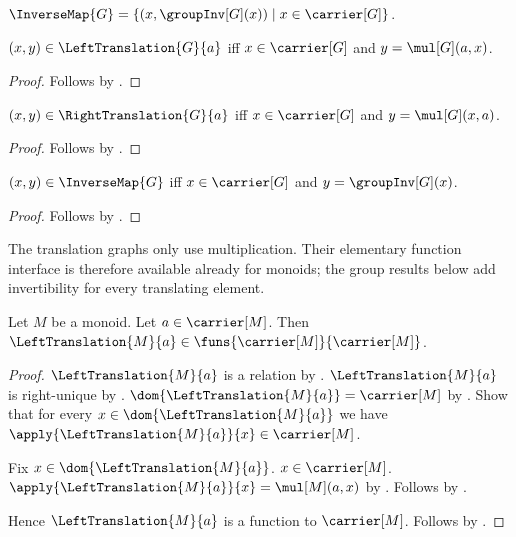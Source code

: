 \begin{definition}\label{inverse_map}
    $\InverseMap{G}=
        \{(x,\groupInv[G](x))\mid x\in\carrier[G]\}$.
\end{definition}

\begin{proposition}\label{left_translation_iff}
    $(x,y)\in\LeftTranslation{G}{a}$ iff
        $x\in\carrier[G]$ and $y=\mul[G](a,x)$.
\end{proposition}
\begin{proof}
    Follows by .
\end{proof}
\begin{proposition}\label{right_translation_iff}
    $(x,y)\in\RightTranslation{G}{a}$ iff
        $x\in\carrier[G]$ and $y=\mul[G](x,a)$.
\end{proposition}
\begin{proof}
    Follows by .
\end{proof}

\begin{proposition}\label{inverse_map_iff}
    $(x,y)\in\InverseMap{G}$ iff
        $x\in\carrier[G]$ and $y=\groupInv[G](x)$.
\end{proposition}
\begin{proof}
    Follows by .
\end{proof}

The translation graphs only use multiplication.  Their elementary function
interface is therefore available already for monoids; the group results below
add invertibility for every translating element.

\begin{proposition}\label{left_translation_monoid_function}
    Let $M$ be a monoid.
    Let $a\in\carrier[M]$.
    Then $\LeftTranslation{M}{a}\in
        \funs{\carrier[M]}{\carrier[M]}$.
\end{proposition}
\begin{proof}
    $\LeftTranslation{M}{a}$ is a relation
        by .
    $\LeftTranslation{M}{a}$ is right-unique
        by .
    $\dom{\LeftTranslation{M}{a}}=\carrier[M]$
        by .
    Show that for every $x\in\dom{\LeftTranslation{M}{a}}$ we have
        $\apply{\LeftTranslation{M}{a}}{x}\in\carrier[M]$.
    \begin{subproof}
        Fix $x\in\dom{\LeftTranslation{M}{a}}$.
        $x\in\carrier[M]$.
        $\apply{\LeftTranslation{M}{a}}{x}=\mul[M](a,x)$
            by .
        Follows by .
    \end{subproof}
    Hence $\LeftTranslation{M}{a}$ is a function to $\carrier[M]$.
    Follows by .
\end{proof}

